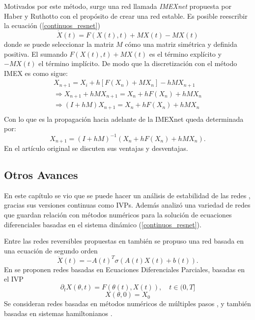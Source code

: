 Motivados por este método, surge una red llamada \textsl{IMEXnet} \cite{INEX-NET} propuesta por Haber y Ruthotto con el propósito de crear una red estable. Es posible reescribir la ecuación (\ref{continuos_resnet})
\begin{equation}
   \dot X(t) = F(X(t), t) + MX(t) - MX(t)
\end{equation}
donde se puede seleccionar la matriz $M$ cómo una matriz simétrica y definida positiva. El sumando $F(X(t), t) + MX(t)$ es el término explícito y $- MX(t)$ el término implícito. De modo que la discretización con el método IMEX es como sigue:
\begin{align}
   X_{n+1} = X_{i} + h[F(X_n) + MX_n] - hMX_{n+1} \\
   \Rightarrow X_{n+1} + hMX_{n+1} = X_{n} + hF(X_n) + hMX_n \\
   \Rightarrow (I + hM)X_{n+1} = X_{n} + hF(X_n) + hMX_n \\
\end{align}
Con lo que es la propagación hacia adelante de la IMEXnet queda determinada por:
\begin{equation}
   X_{n+1} = (I + hM)^{-1}(X_{n} + hF(X_n) + hMX_n).
\end{equation}
En el artículo original \cite{INEX-NET} se discuten sus ventajas y desventajas.

\subsection{Otros Avances}
En este capítulo se vio que se puede hacer un análisis de estabilidad de las redes \cite{chang2019antisymmetricrnn,stable_resnets}, gracias sus versiones continuas como IVPs. Además analizó una variedad de redes que guardan relación con métodos numéricos para la solución de ecuaciones diferenciales basadas en el sistema dinámico (\ref{continuos_resnet}).

Entre las redes reversibles propuestas en \cite{reversible_nets} también se propuso una red basada en una ecuación de segundo orden 
\begin{equation}
   \ddot{X}(t) = -A(t)^T\sigma(A(t)X(t) + b(t)).
\end{equation}
En \cite{PDE_nets} se proponen redes basadas en Ecuaciones Diferenciales Parciales, basadas en el IVP 
\begin{equation}
   \partial_t X(\theta, t) = F(\theta(t), X(t)), \quad t\in (0,T]    
\end{equation}
\begin{equation}
   X(\theta, 0) = X_0
\end{equation}
Se consideran redes basadas en métodos numéricos de múltiples pasos \cite{numerical_ode_and_architectures}, y también basadas en sistemas hamiltonianos \cite{stable_resnets,reversible_nets}.

